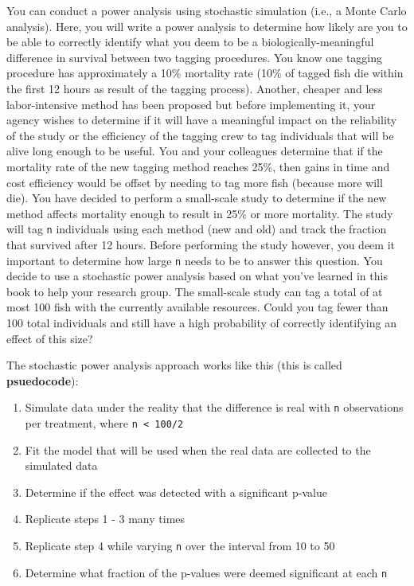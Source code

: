 \documentclass[]{book}
\providecommand{\tightlist}{%
  \setlength{\itemsep}{0pt}\setlength{\parskip}{0pt}}
\theoremstyle{definition}
\theoremstyle{definition}
\theoremstyle{definition}
\theoremstyle{remark}
\begin{document}
You can conduct a power analysis using stochastic simulation (i.e., a
Monte Carlo analysis). Here, you will write a power analysis to
determine how likely are you to be able to correctly identify what you
deem to be a biologically-meaningful difference in survival between two
tagging procedures. You know one tagging procedure has approximately a
10\% mortality rate (10\% of tagged fish die within the first 12 hours
as result of the tagging process). Another, cheaper and less
labor-intensive method has been proposed but before implementing it,
your agency wishes to determine if it will have a meaningful impact on
the reliability of the study or the efficiency of the tagging crew to
tag individuals that will be alive long enough to be useful. You and
your colleagues determine that if the mortality rate of the new tagging
method reaches 25\%, then gains in time and cost efficiency would be
offset by needing to tag more fish (because more will die). You have
decided to perform a small-scale study to determine if the new method
affects mortality enough to result in 25\% or more mortality. The study
will tag \texttt{n} individuals using each method (new and old) and
track the fraction that survived after 12 hours. Before performing the
study however, you deem it important to determine how large \texttt{n}
needs to be to answer this question. You decide to use a stochastic
power analysis based on what you've learned in this book to help your
research group. The small-scale study can tag a total of at most 100
fish with the currently available resources. Could you tag fewer than
100 total individuals and still have a high probability of correctly
identifying an effect of this size?

The stochastic power analysis approach works like this (this is called
\textbf{psuedocode}):

\begin{enumerate}
\def\labelenumi{\arabic{enumi}.}
\tightlist
\item
  Simulate data under the reality that the difference is real with
  \texttt{n} observations per treatment, where
  \texttt{n\ \textless{}\ 100/2}
\item
  Fit the model that will be used when the real data are collected to
  the simulated data
\item
  Determine if the effect was detected with a significant p-value
\item
  Replicate steps 1 - 3 many times
\item
  Replicate step 4 while varying \texttt{n} over the interval from 10 to
  50
\item
  Determine what fraction of the p-values were deemed significant at
  each \texttt{n}
\end{enumerate}
\end{document}
